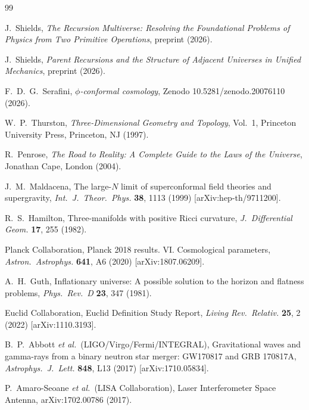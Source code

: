 \documentclass[prd,twocolumn,preprintnumbers,amsmath,amssymb]{revtex4-2}
\begin{document}
\begin{thebibliography}{99}

J.~Shields,
\textit{The Recursion Multiverse: Resolving the Foundational Problems of
Physics from Two Primitive Operations},
preprint (2026).

J.~Shields,
\textit{Parent Recursions and the Structure of Adjacent Universes in Unified
Mechanics},
preprint (2026).

F.~D.~G.~Serafini,
\textit{$\phi$-conformal cosmology},
Zenodo 10.5281/zenodo.20076110 (2026).

W.~P.~Thurston,
\textit{Three-Dimensional Geometry and Topology}, Vol.~1,
Princeton University Press, Princeton, NJ (1997).

R.~Penrose,
\textit{The Road to Reality: A Complete Guide to the Laws of the Universe},
Jonathan Cape, London (2004).

J.~M.~Maldacena,
The large-$N$ limit of superconformal field theories and supergravity,
\textit{Int.\ J.\ Theor.\ Phys.} \textbf{38}, 1113 (1999)
[arXiv:hep-th/9711200].

R.~S.~Hamilton,
Three-manifolds with positive Ricci curvature,
\textit{J.\ Differential Geom.} \textbf{17}, 255 (1982).

Planck Collaboration,
Planck 2018 results. VI. Cosmological parameters,
\textit{Astron.\ Astrophys.} \textbf{641}, A6 (2020)
[arXiv:1807.06209].

A.~H.~Guth,
Inflationary universe: A possible solution to the horizon and flatness problems,
\textit{Phys.\ Rev.\ D} \textbf{23}, 347 (1981).

Euclid Collaboration,
Euclid Definition Study Report,
\textit{Living Rev.\ Relativ.} \textbf{25}, 2 (2022)
[arXiv:1110.3193].

B.~P.~Abbott \textit{et al.}\ (LIGO/Virgo/Fermi/INTEGRAL),
Gravitational waves and gamma-rays from a binary neutron star merger:
GW170817 and GRB 170817A,
\textit{Astrophys.\ J.\ Lett.} \textbf{848}, L13 (2017)
[arXiv:1710.05834].

P.~Amaro-Seoane \textit{et al.}\ (LISA Collaboration),
Laser Interferometer Space Antenna,
arXiv:1702.00786 (2017).

\end{thebibliography}
\end{document}
